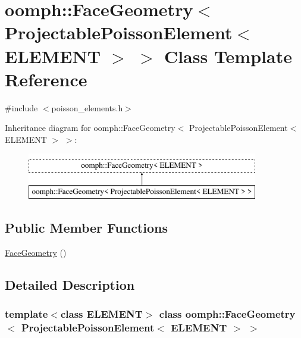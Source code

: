 \hypertarget{classoomph_1_1FaceGeometry_3_01ProjectablePoissonElement_3_01ELEMENT_01_4_01_4}{}\section{oomph\+:\+:Face\+Geometry$<$ Projectable\+Poisson\+Element$<$ E\+L\+E\+M\+E\+NT $>$ $>$ Class Template Reference}
\label{classoomph_1_1FaceGeometry_3_01ProjectablePoissonElement_3_01ELEMENT_01_4_01_4}


{\ttfamily \#include $<$poisson\+\_\+elements.\+h$>$}

Inheritance diagram for oomph\+:\+:Face\+Geometry$<$ Projectable\+Poisson\+Element$<$ E\+L\+E\+M\+E\+NT $>$ $>$\+:\begin{figure}[H]
\begin{center}
\leavevmode
\includegraphics[height=2.000000cm]{classoomph_1_1FaceGeometry_3_01ProjectablePoissonElement_3_01ELEMENT_01_4_01_4}
\end{center}
\end{figure}
\subsection*{Public Member Functions}
\begin{DoxyCompactItemize}
\item 
\hyperlink{classoomph_1_1FaceGeometry_3_01ProjectablePoissonElement_3_01ELEMENT_01_4_01_4_aa5469f0278a5a7e8c474220abeae3ff4}{Face\+Geometry} ()
\end{DoxyCompactItemize}


\subsection{Detailed Description}
\subsubsection*{template$<$class E\+L\+E\+M\+E\+NT$>$\newline
class oomph\+::\+Face\+Geometry$<$ Projectable\+Poisson\+Element$<$ E\+L\+E\+M\+E\+N\+T $>$ $>$}

